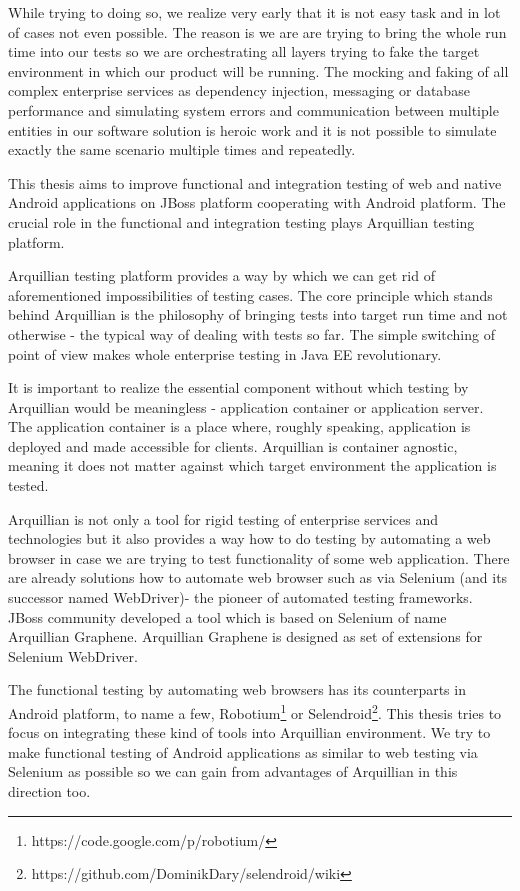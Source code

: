 \documentclass[12pt,final,oneside]{fithesis}
\begin{document}
While trying to doing so, we realize very early that it is not easy task and in lot of cases not even possible. The reason is we are are trying to bring the whole run time into our tests so we are orchestrating all layers trying to fake the target environment in which our product will be running. The mocking and faking of all complex enterprise services as dependency injection, messaging or database performance and simulating system errors and communication between multiple entities in our software solution is heroic work and it is not possible to simulate exactly the same scenario multiple times and repeatedly.

This thesis aims to improve functional and integration testing of web and native Android applications on JBoss platform cooperating with Android platform. The crucial role in the functional and integration testing plays Arquillian testing platform.

Arquillian testing platform provides a way by which we can get rid of aforementioned impossibilities of testing cases. The core principle which stands behind Arquillian is the philosophy of bringing tests into target run time and not otherwise - the typical way of dealing with tests so far. The simple switching of point of view makes whole enterprise testing in Java EE revolutionary. 

It is important to realize the essential component without which testing by Arquillian would be meaningless - application container or application server. The application container is a place where, roughly speaking, application is deployed and made accessible for clients. Arquillian is container agnostic, meaning it does not matter against which target environment the application is tested.

Arquillian is not only a tool for rigid testing of enterprise services and technologies but it also provides a way how to do testing by automating a web browser in case we are trying to test functionality of some web application. There are already solutions how to automate web browser such as via Selenium (and its successor named WebDriver)- the pioneer of automated testing frameworks. JBoss community developed a tool which is based on Selenium of name Arquillian Graphene. Arquillian Graphene is designed as set of extensions for Selenium WebDriver.

The functional testing by automating web browsers has its counterparts in Android platform, to name a few, Robotium\footnote{https://code.google.com/p/robotium/} or Selendroid\footnote{https://github.com/DominikDary/selendroid/wiki}. This thesis tries to focus on integrating these kind of tools into Arquillian environment. We try to make functional testing of Android applications as similar to web testing via Selenium as possible so we can gain from advantages of Arquillian in this direction too. 
\end{document}
